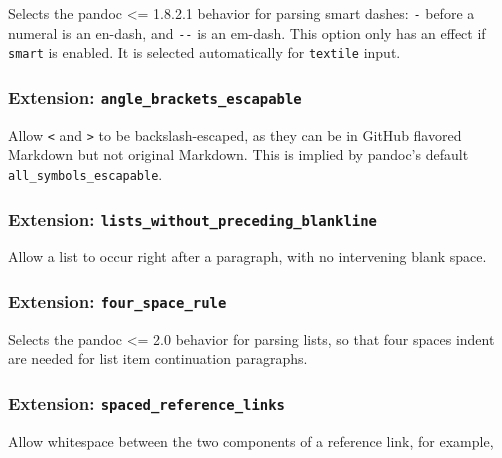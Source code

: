 \documentclass[
]{article}
\begin{document}
Selects the pandoc \textless= 1.8.2.1 behavior for parsing smart dashes:
\texttt{-} before a numeral is an en-dash, and \texttt{-\/-} is an
em-dash. This option only has an effect if \texttt{smart} is enabled. It
is selected automatically for \texttt{textile} input.

\hypertarget{extension-angle_brackets_escapable}{%
\subsubsection{\texorpdfstring{Extension:
\texttt{angle\_brackets\_escapable}}{Extension: angle\_brackets\_escapable}}\label{extension-angle_brackets_escapable}}

Allow \texttt{\textless{}} and \texttt{\textgreater{}} to be
backslash-escaped, as they can be in GitHub flavored Markdown but not
original Markdown. This is implied by pandoc's default
\texttt{all\_symbols\_escapable}.

\hypertarget{extension-lists_without_preceding_blankline}{%
\subsubsection{\texorpdfstring{Extension:
\texttt{lists\_without\_preceding\_blankline}}{Extension: lists\_without\_preceding\_blankline}}\label{extension-lists_without_preceding_blankline}}

Allow a list to occur right after a paragraph, with no intervening blank
space.

\hypertarget{extension-four_space_rule}{%
\subsubsection{\texorpdfstring{Extension:
\texttt{four\_space\_rule}}{Extension: four\_space\_rule}}\label{extension-four_space_rule}}

Selects the pandoc \textless= 2.0 behavior for parsing lists, so that
four spaces indent are needed for list item continuation paragraphs.

\hypertarget{extension-spaced_reference_links}{%
\subsubsection{\texorpdfstring{Extension:
\texttt{spaced\_reference\_links}}{Extension: spaced\_reference\_links}}\label{extension-spaced_reference_links}}

Allow whitespace between the two components of a reference link, for
example,
\end{document}
